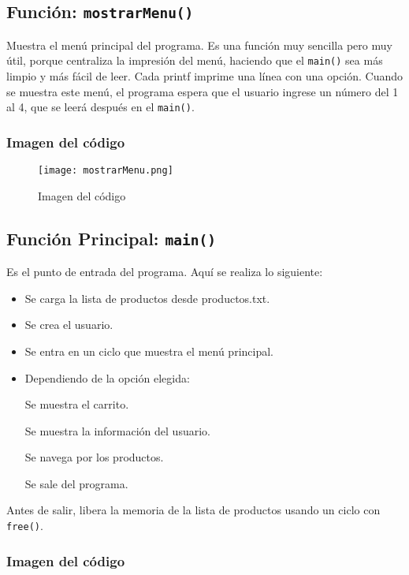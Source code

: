 \documentclass{article}
\begin{document}
   \subsection{Función: \texttt{mostrarMenu()}}
  Muestra el menú principal del programa. Es una función muy sencilla pero muy útil, porque centraliza la impresión del menú, haciendo que el \texttt{main()} sea más limpio y más fácil de leer. Cada printf imprime una línea con una opción. Cuando se muestra este menú, el programa espera que el usuario ingrese un número del 1 al 4, que se leerá después en el \texttt{main()}.

   \subsubsection{Imagen del código}
   
\begin{figure}[!ht]
\centering
\texttt{[image: mostrarMenu.png]}
\caption{Imagen del código}
\end{figure} 

   \subsection{Función Principal: \texttt{main()}}
   Es el punto de entrada del programa. Aquí se realiza lo siguiente:
\begin{itemize}
    \item \textbf{} Se carga la lista de productos desde productos.txt.

\item \textbf{}Se crea el usuario.

\item \textbf{}Se entra en un ciclo que muestra el menú principal.

\item \textbf{}Dependiendo de la opción elegida:

Se muestra el carrito.

Se muestra la información del usuario.

Se navega por los productos.

Se sale del programa.
\end{itemize}
Antes de salir, libera la memoria de la lista de productos usando un ciclo con \texttt{free()}.

   \subsubsection{Imagen del código}
   
\end{document}

